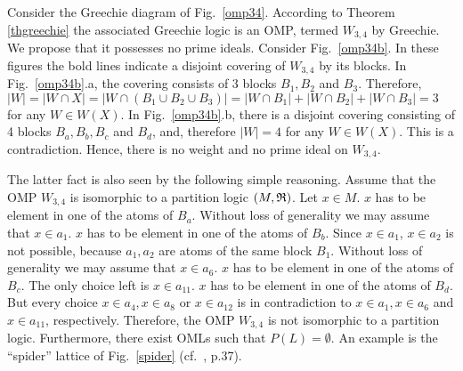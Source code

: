 Consider the Greechie diagram of Fig.~\ref{omp34}.
According to Theorem \ref{thgreechie} the associated
Greechie logic is an OMP, termed $W_{3,4}$ by Greechie.
We propose that it possesses no prime ideals.
Consider Fig.~\ref{omp34b}.
In these figures the bold lines indicate a disjoint covering of $W_{3,4}$
by its blocks.
In Fig.~\ref{omp34b}.a, the covering consists of 3 blocks $B_1,B_2$ and
$B_3$. Therefore, \\
$|W| = |W \cap X| = |W \cap (B_1 \cup B_2 \cup B_3)| =
|W \cap B_1| + |W \cap B_2| + |W \cap B_3| = 3$
for any $W \in W(X)$.
In Fig.~\ref{omp34b}.b, there is a  disjoint covering consisting of 4
blocks
$B_a,B_b,B_c$ and $B_d$, and, therefore $|W| = 4$ for any $W \in W(X)$.
This is a contradiction.
Hence,
there is no weight and no
prime ideal on $W_{3,4}$.

The latter fact is also seen by the following simple reasoning.
Assume that the OMP $W_{3,4}$ is isomorphic to a partition logic $(M,{\frak R})$.
Let $x \in M$.
$x$ has to be element in one of the atoms of $B_a$.
Without loss of generality we may assume that $x \in a_1$.
$x$ has to be element in one of the atoms of $B_b$.
Since $x\in a_1$, $x \in a_2$ is not possible,
because $a_1,a_2$ are atoms of the same block $B_1$.
Without loss of generality we may assume that $x \in a_6$.
$x$ has to be element in one of the atoms of $B_c$.
The only choice left is $x \in a_{11}$.
$x$ has to be element in one of the atoms of $B_d$.
But every choice $x \in a_4,x \in a_8$ or $x \in a_{12}$ is in
contradiction to $x \in a_1,x \in a_6$ and $x \in a_{11}$, respectively.
Therefore, the OMP $W_{3,4}$ is not isomorphic to a partition logic.
Furthermore, there exist OMLs such that $P(L) = \emptyset$.
An example is the ``spider'' lattice of Fig.~\ref{spider}
(cf.~\cite{ptak}, p.37).

